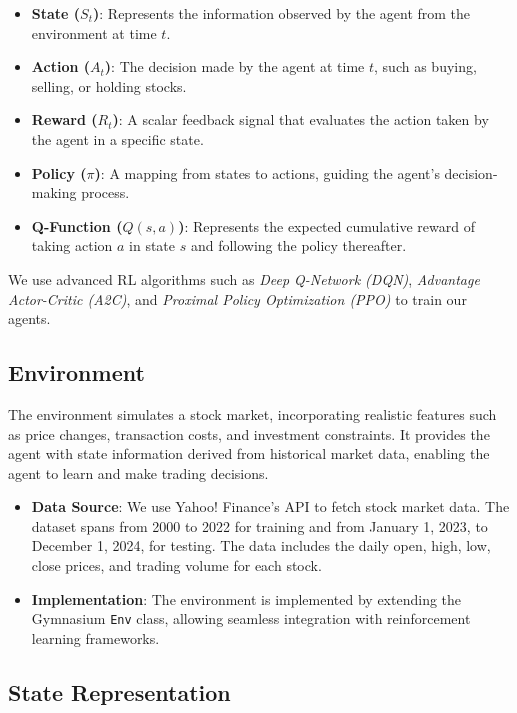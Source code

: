 \documentclass[conference]{IEEEtran}
\begin{document}
\begin{itemize}
    \item \textbf{State ($S_t$)}: Represents the information observed by the agent from the environment at time $t$.
    \item \textbf{Action ($A_t$)}: The decision made by the agent at time $t$, such as buying, selling, or holding stocks.
    \item \textbf{Reward ($R_t$)}: A scalar feedback signal that evaluates the action taken by the agent in a specific state.
    \item \textbf{Policy ($\pi$)}: A mapping from states to actions, guiding the agent's decision-making process.
    \item \textbf{Q-Function ($Q(s, a)$)}: Represents the expected cumulative reward of taking action $a$ in state $s$ and following the policy thereafter.
\end{itemize}

We use advanced RL algorithms such as \textit{Deep Q-Network (DQN)}, \textit{Advantage Actor-Critic (A2C)}, and \textit{Proximal Policy Optimization (PPO)} to train our agents.

\subsection{Environment}

The environment simulates a stock market, incorporating realistic features such as price changes, transaction costs, and investment constraints. It provides the agent with state information derived from historical market data, enabling the agent to learn and make trading decisions.

\begin{itemize}
    \item \textbf{Data Source}: We use Yahoo! Finance's API to fetch stock market data. The dataset spans from 2000 to 2022 for training and from January 1, 2023, to December 1, 2024, for testing. The data includes the daily open, high, low, close prices, and trading volume for each stock.
    \item \textbf{Implementation}: The environment is implemented by extending the Gymnasium \texttt{Env} class, allowing seamless integration with reinforcement learning frameworks.
\end{itemize}

\subsection{State Representation}
\end{document}
